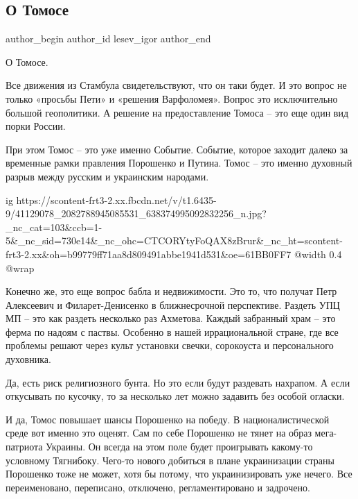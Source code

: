  
 
 
 
 
 
\subsection{О Томосе}
\label{sec:07_09_2018.fb.lesev_igor.1.o_tomose}
 
\ifcmt
 author_begin
   author_id lesev_igor
 author_end
\fi

О Томосе.

Все движения из Стамбула свидетельствуют, что он таки будет. И это вопрос не
только «просьбы Пети» и «решения Варфоломея». Вопрос это исключительно большой
геополитики. А решение на предоставление Томоса – это еще один вид порки
России.

При этом Томос – это уже именно Событие. Событие, которое заходит далеко за
временные рамки правления Порошенко и Путина. Томос – это именно духовный
разрыв между русским и украинским народами.

\ifcmt
  ig https://scontent-frt3-2.xx.fbcdn.net/v/t1.6435-9/41129078_2082788945085531_638374995092832256_n.jpg?_nc_cat=103&ccb=1-5&_nc_sid=730e14&_nc_ohc=CTCORYtyFoQAX8zBrur&_nc_ht=scontent-frt3-2.xx&oh=b99779ff71aa8d809491abbe1941d531&oe=61BB0FF7
  @width 0.4
  @wrap 
\fi

Конечно же, это еще вопрос бабла и недвижимости. Это то, что получат Петр
Алексеевич и Филарет-Денисенко в ближнесрочной перспективе. Раздеть УПЦ МП –
это как раздеть несколько раз Ахметова. Каждый забранный храм – это ферма по
надоям с паствы. Особенно в нашей иррациональной стране, где все проблемы
решают через культ установки свечки, сорокоуста и персонального духовника.

Да, есть риск религиозного бунта. Но это если будут раздевать нахрапом. А если
откусывать по кусочку, то за несколько лет можно задавить без особой огласки.

И да, Томос повышает шансы Порошенко на победу. В националистической среде вот
именно это оценят. Сам по себе Порошенко не тянет на образ мега-патриота
Украины. Он всегда на этом поле будет проигрывать какому-то условному
Тягнибоку. Чего-то нового добиться в плане украинизации страны Порошенко тоже
не может, хотя бы потому, что украинизировать уже нечего. Все переименовано,
переписано, отключено, регламентировано и задрочено.


